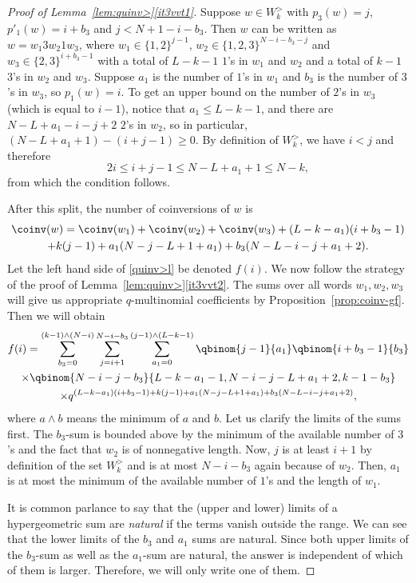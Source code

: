 \begin{proof}[Proof of Lemma~\ref{lem:quinv>}\ref{it3vvt1}]
Suppose $w \in  W_k^>$ with $p_3(w) = j$, $p'_1(w) = i+b_3$ and $j < N+1 - i-b_3$. Then
$w$ can be written as $w = w_1 3 w_2 1 w_3$, where $w_1 \in \{1,2\}^{j-1}$, $w_2 \in \{1,2,3\}^{N-i-b_3-j}$ 
and $w_3 \in \{2,3\}^{i+b_3-1}$ with a total of $L-k-1$ $1$'s in $w_1$ and $w_2$ and a total of
$k-1$ $3$'s in $w_2$ and $w_3$. 
Suppose $a_1$ is the number of $1$'s in $w_1$ and $b_3$ is the number of $3$'s in $w_3$, so $p_1(w) = i$. To get an upper bound on the number of $2$'s in $w_3$ (which is equal to $i-1$), notice that $a_1 \leq L-k-1$, and there are $N-L+a_1-i-j+2$ $2$'s in $w_2$, so in particular, $(N-L+a_1+1) -(i+j-1) \geq 0$. By definition of $W_k^>$, we have $i < j$ and therefore
\[
2i \leq i+j-1 \leq N - L + a_1 + 1 \leq N - k,
\]
from which the condition follows.

After this split, the number of coinversions of $w$ is
\begin{multline*}
\coinv(w) = \coinv(w_1) + \coinv(w_2) +\coinv(w_3) + (L-k-a_1)(i+b_3-1)  \\
+ k(j-1) + a_1(N-j-L+1+a_1) + b_3(N-L-i-j+a_1+2).
\end{multline*}
Let the left hand side of \eqref{quinv>l} be denoted $f(i)$.
We now follow the strategy of the proof of Lemma~\ref{lem:quinv>}\ref{it3vvt2}. The sums over all
words $w_1, w_2, w_3$ will give us appropriate $q$-multinomial coefficients by 
Proposition~\ref{prop:coinv-gf}. Then we will obtain
\begin{multline*}
f(i) =  \sum_{b_3 = 0}^{(k-1) \wedge (N-i)}   \sum_{j=i+1}^{N-i-b_3}  \sum_{a_1 = 0}^{(j-1) \wedge (L-k-1)} 
\qbinom {j-1}{a_1} \qbinom{i+b_3-1}{b_3}\\
\times \qbinom {N-i-j-b_3}{L-k-a_1-1, N-i-j-L+a_1+2,k-1-b_3} \\
\times q^{(L-k-a_1)(i+b_3-1) + k(j-1) + a_1(N-j-L+1+a_1) + b_3(N-L-i-j+a_1+2)},
\end{multline*}
where $a \wedge b$ means the minimum of $a$ and $b$.
Let us clarify the limits of the sums first. 
The $b_3$-sum is bounded above by the minimum
of the available number of $3$'s and the fact that $w_2$ is of nonnegative length. 
Now, $j$ is at least $i+1$ by definition of the set 
$W_k^>$ and is at most $N-i-b_3$ again because of $w_2$.
Then, $a_1$ is at most the minimum of the available number of $1$'s and the length
of $w_1$.

It is common parlance to say that the (upper and lower) limits of a hypergeometric sum are \emph{natural} if the terms vanish outside the range. We can see that the lower limits of the $b_3$ and $a_1$ sums are natural. Since both upper limits of the $b_3$-sum as well as the $a_1$-sum are natural, the answer is independent of which of them is larger. Therefore, we will only write one of them.


\end{proof}

